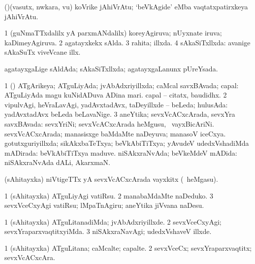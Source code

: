 {\bentry 
{} 
\gl{\nA}
\expl{}
\bmng
(\ame)(vasutx, nwkara, \mo vu) koVrike jAhiVrAtu; `beVkAgide\eng' eMba vaqtatxpatirxkeya jAhiVrAtu. 
\emng
\eentry

\bentry
{} 
\gl{\gu}
\expl{}
\bmng
\bnum
\num{1} (guNmaTTxdalilx yA parxmANdalilx) koreyAgiruva; nUyxnate iruva; kaDimeyAgiruva. 
\num{2} agatayxkekx sAlda. 
\num{3} rahita; illxda. 
\num{4} sAkaSiTxllxda:  avanige sAkaSuTx viveVcane illx. 
\enum
\emng

\noindent 
\gl{\pagu}
\expl{}
\bmng
{} agatayxgaLige sAldAda; sAkaSiTxllxda; agatayxgaLanunx pUreYsada. 
\emng
\eentry

\bentry 
{} 
\gl{\gu}
\expl{}
\bmng
\bnum
\num{1} (\pArxparx) ATgArikeya; ATguLiyAda; jvAbAdxriyillxda; caMcal savxBAvada; capal:  ATguLiyAda magu  kuNidADuva ADina mari.  capal -- citatx, baudidhx. 
\num{2} vipulvAgi, heVraLavAgi, yadAvxtadAvx, taDeyillxde -- beLeda; hulusAda:  yadAvxtadAvx beLeda beLavaNige. 
\num{3} aneYtika; sevxVcACxcArada, sevxYra savxBAvada:  sevxYriNi; sevxVcACxcArada heMgusu, \kanmu\ vayxBicAriNi. 
\banum
{} sevxVcACxcArada; manasisxge baMdaMte naDeyuva; manasoV iceCxya. 
 gotutxguriyillxda; sikAkxbaTeTxya; beVkAbiTiTxya; yAvudeV udedxVshadiMda mADirada:  beVkAbiTiTxya maduve. 
 niSAkxraNvAda; beVkeMdeV mADida:  niSAkxraNvAda dALi, AkarxmaN. 
\eanum
\numie
\enum
\emng
\eentry

\bentry 
{} 
\gl{\nA}
\expl{}
\bmng
(sAhitayxka) niVtigeTTx yA sevxVcACxcArada vayxkitx (\kanmu\ heMgasu). 
\emng
\eentry

\bentry 
{} 
\gl{\akirx}
\expl{}
\bmng
\bnum
\num{1} (sAhitayxka) ATguLiyAgi vatiRsu. 
\num{2} manabaMdaMte naDeduko. 
\num{3} sevxVceCxyAgi vatiRsu; lMpaTnAgiru; aneYtika jiVvana naDesu. 
\enum
\emng
\eentry

\bentry
{} 
\gl{\kirxvi}
\expl{}
\bmng
\bnum
\num{1} (sAhitayxka) ATguLitanadiMda; jvAbAdxriyillxde. 
\num{2} sevxVceCxyAgi; sevxYraparxvaqtitxyiMda. 
\num{3} niSAkxraNavAgi; udedxVshaveV illxde. 
\enum
\emng
\eentry

\bentry
{} 
\gl{\nA}
\expl{}
\bmng
\bnum
\num{1} (sAhitayxka) ATguLitana; caMcalte; capalte. 
\num{2} sevxVceCx; sevxYraparxvaqtitx; sevxVcACxcAra. 
\enum
\emng
\eentry

}
